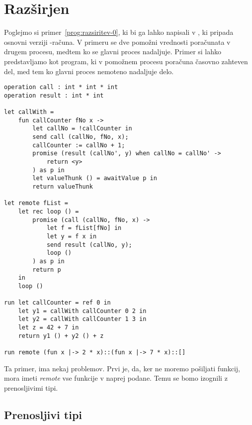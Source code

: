 \section{Razširjen \lae{}}\label{sec:razsirjen-lae}

Poglejmo si primer~\ref{prog:razsiritev-0}, ki bi ga lahko napisali v \aeff{}, ki pripada osnovni verziji \lae{}\nobreakdash-računa. V primeru se dve pomožni vrednosti poračunata v drugem procesu, medtem ko se glavni proces nadaljuje. 
Primer si lahko predstavljamo kot program, ki v pomožnem procesu poračuna časovno zahteven del, med tem ko glavni proces nemoteno nadaljuje delo.


\begin{lstlisting}[caption={Računanje zahtevne funkcije v ozadju.},label={prog:razsiritev-0},float,floatplacement=h]
operation call : int * int * int
operation result : int * int

let callWith =
	fun callCounter fNo x ->
		let callNo = !callCounter in
		send call (callNo, fNo, x);
		callCounter := callNo + 1;
		promise (result (callNo', y) when callNo = callNo' ->
			return <y>
		) as p in
		let valueThunk () = awaitValue p in
		return valueThunk

let remote fList =
	let rec loop () =
		promise (call (callNo, fNo, x) ->
			let f = fList[fNo] in
			let y = f x in
			send result (callNo, y);
			loop ()
		) as p in
		return p
	in
	loop ()

run	let callCounter = ref 0 in
	let y1 = callWith callCounter 0 2 in
	let y2 = callWith callCounter 1 3 in
	let z = 42 + 7 in
	return y1 () + y2 () + z

run remote (fun x |-> 2 * x)::(fun x |-> 7 * x)::[]
\end{lstlisting}

Ta primer, ima nekaj problemov. Prvi je, da, ker ne moremo pošiljati funkcij, mora imeti \emph{remote} vse funkcije v naprej podane. Temu se bomo izognili z prenosljivimi tipi.

\subsection{Prenosljivi tipi}

